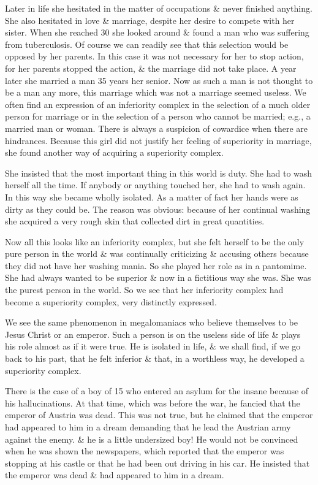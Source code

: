 \documentclass{article}
\numberwithin{equation}{section}
\begin{document}
Later in life she hesitated in the matter of occupations \& never finished anything. She also hesitated in love \& marriage, despite her desire to compete with her sister. When she reached 30 she looked around \& found a man who was suffering from tuberculosis. Of course we can readily see that this selection would be opposed by her parents. In this case it was not necessary for her to stop action, for her parents stopped the action, \& the marriage did not take place. A year later she married a man 35 years her senior. Now as such a man is not thought to be a man any more, this marriage which was not a marriage seemed useless. We often find an expression of an inferiority complex in the selection of a much older person for marriage or in the selection of a person who cannot be married; e.g., a married man or woman. There is always a suspicion of cowardice when there are hindrances. Because this girl did not justify her feeling of superiority in marriage, she found another way of acquiring a superiority complex.

She insisted that the most important thing in this world is duty. She had to wash herself all the time. If anybody or anything touched her, she had to wash again. In this way she became wholly isolated. As a matter of fact her hands were as dirty as they could be. The reason was obvious: because of her continual washing she acquired a very rough skin that collected dirt in great quantities.

Now all this looks like an inferiority complex, but she felt herself to be the only pure person in the world \& was continually criticizing \& accusing others because they did not have her washing mania. So she played her role as in a pantomime. She had always wanted to be superior \& now in a fictitious way she was. She was the purest person in the world. So we see that her inferiority complex had become a superiority complex, very distinctly expressed.

We see the same phenomenon in megalomaniacs who believe themselves to be Jesus Christ or an emperor. Such a person is on the useless side of life \& plays his role almost as if it were true. He is isolated in life, \& we shall find, if we go back to his past, that he felt inferior \& that, in a worthless way, he developed a superiority complex.

There is the case of a boy of 15 who entered an asylum for the insane because of his hallucinations. At that time, which was before the war, he fancied that the emperor of Austria was dead. This was not true, but he claimed that the emperor had appeared to him in a dream demanding that he lead the Austrian army against the enemy. \& he is a little undersized boy! He would not be convinced when he was shown the newspapers, which reported that the emperor was stopping at his castle or that he had been out driving in his car. He insisted that the emperor was dead \& had appeared to him in a dream.
\end{document}
